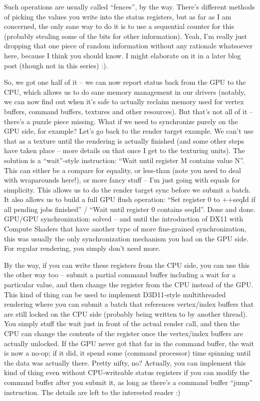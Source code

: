 \documentclass[12pt]{article}
\begin{document}
Such operations are usually called “fences”, by the way. There’s different methods of picking the values you write into the status registers, but as far as I am concerned, the only sane way to do it is to use a sequential counter for this (probably stealing some of the bits for other information). Yeah, I’m really just dropping that one piece of random information without any rationale whatsoever here, because I think you should know. I might elaborate on it in a later blog post (though not in this series) :).

So, we got one half of it – we can now report status back from the GPU to the CPU, which allows us to do sane memory management in our drivers (notably, we can now find out when it’s safe to actually reclaim memory used for vertex buffers, command buffers, textures and other resources). But that’s not all of it – there’s a puzzle piece missing. What if we need to synchronize purely on the GPU side, for example? Let’s go back to the render target example. We can’t use that as a texture until the rendering is actually finished (and some other steps have taken place – more details on that once I get to the texturing units). The solution is a “wait”-style instruction: “Wait until register M contains value N”. This can either be a compare for equality, or less-than (note you need to deal with wraparounds here!), or more fancy stuff – I’m just going with equals for simplicity. This allows us to do the render target sync before we submit a batch. It also allows us to build a full GPU flush operation: “Set register 0 to ++seqId if all pending jobs finished” / “Wait until register 0 contains seqId”. Done and done. GPU/GPU synchronization: solved – and until the introduction of DX11 with Compute Shaders that have another type of more fine-grained synchronization, this was usually the only synchronization mechanism you had on the GPU side. For regular rendering, you simply don’t need more.

By the way, if you can write these registers from the CPU side, you can use this the other way too – submit a partial command buffer including a wait for a particular value, and then change the register from the CPU instead of the GPU. This kind of thing can be used to implement D3D11-style multithreaded rendering where you can submit a batch that references vertex/index buffers that are still locked on the CPU side (probably being written to by another thread). You simply stuff the wait just in front of the actual render call, and then the CPU can change the contents of the register once the vertex/index buffers are actually unlocked. If the GPU never got that far in the command buffer, the wait is now a no-op; if it did, it spend some (command processor) time spinning until the data was actually there. Pretty nifty, no? Actually, you can implement this kind of thing even without CPU-writeable status registers if you can modify the command buffer after you submit it, as long as there’s a command buffer “jump” instruction. The details are left to the interested reader :)
\end{document}
